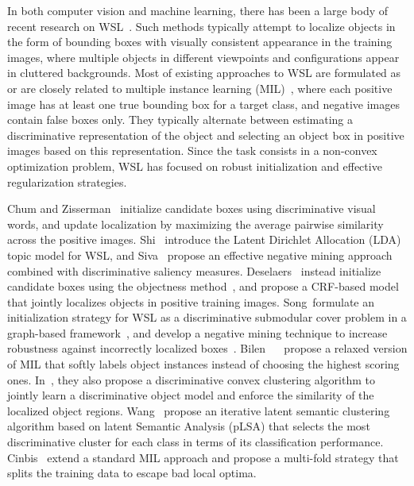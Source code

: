 \documentclass[runningheads]{llncs}
\begin{document}
In both computer vision and machine learning, there has been a large body of recent research on WSL~\cite{Anonymous:2007fd,shi2012transfer,siva2012defence,Deselaers:2012ci,Siva2013,song2014learning,song14slsvm,bilen2014weakly,bilen2015weakly,Wang:2014tg,Cinbis:2015wn,Oquab:2015us,Bilen:2015uo,Jaderberg:2015vo,Zhou:2015wx}. 
Such methods typically attempt
to localize objects in the form of bounding boxes with visually consistent
appearance in the training images, where multiple objects in different viewpoints
and configurations appear in cluttered backgrounds.  Most of existing approaches
to WSL are formulated as or are closely related to multiple instance learning
(MIL)~\cite{long1998pac}, where each positive image has at least one true
bounding box for a target class, and negative images contain false boxes only.
They typically alternate between
estimating a discriminative representation of the object and selecting an object
box in positive images based on this representation. Since the task consists
in a non-convex optimization problem, WSL has focused on robust initialization
and effective regularization strategies. 

Chum and Zisserman~\cite{Anonymous:2007fd} initialize candidate boxes 
using discriminative visual words, and  update localization by maximizing
the average pairwise similarity across the positive images.
Shi~\etal\cite{shi2012transfer} introduce  the Latent Dirichlet Allocation (LDA) topic model for WSL, and 
Siva~\etal\cite{siva2012defence} propose an effective negative mining approach combined
with discriminative saliency measures.  Deselaers~\etal\cite{Deselaers:2012ci} instead
initialize candidate boxes using the objectness method~\cite{Anonymous:2012kg}, 
and propose a CRF-based model that jointly localizes objects in positive training
images. Song~\etal formulate 
an initialization strategy for WSL as a discriminative submodular cover problem in
a graph-based framework~\cite{song2014learning}, and develop a negative mining technique to increase robustness against incorrectly localized boxes~\cite{song14slsvm}.  Bilen~\etal
~\cite{bilen2014weakly} propose a relaxed version of MIL that softly
labels object instances instead of choosing the highest scoring ones.
In~\cite{bilen2015weakly}, they also propose a discriminative convex clustering
algorithm to jointly learn a discriminative object model and enforce the
similarity of the localized object regions.
Wang~\etal\cite{Wang:2014tg} propose an iterative latent semantic
clustering algorithm based on latent Semantic Analysis (pLSA) that 
selects the most discriminative cluster for each class in terms of its
classification performance. 
Cinbis~\etal\cite{Cinbis:2015wn} extend a standard MIL approach and propose a
multi-fold strategy that splits the training data to escape bad local optima. 
\end{document}
